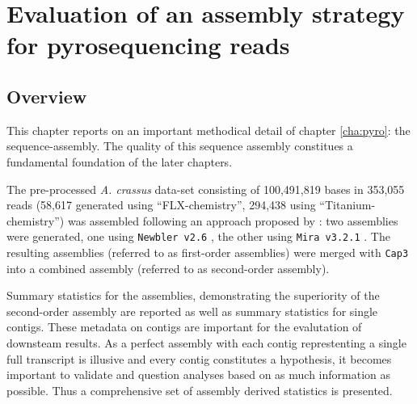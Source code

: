 
\chapter{Evaluation of an assembly strategy for pyrosequencing
  reads} %
\label{chap:eval-ass}


\ifpdf
    \graphicspath{{4_eval_ass/figures/PNG/}{4_eval_ass/figures/PDF/}{4_eval_ass/figures/}}
\else
    \graphicspath{{4_eval_ass/figures/EPS/}{4_eval_ass/figures/}}
\fi



\section{Overview}
\label{sec:over-eval}

This chapter reports on an important methodical detail of chapter
\ref{cha:pyro}: the sequence-assembly. The quality of this sequence
assembly constitues a fundamental foundation of the later chapters.

The pre-processed \textit{A. crassus} data-set consisting of
100,491,819 bases in 353,055 reads (58,617 generated using
``FLX-chemistry'', 294,438 using ``Titanium-chemistry'') was assembled
following an approach proposed by \cite{pmid20950480}: two assemblies
were generated, one using \texttt{Newbler v2.6} \cite{pmid16056220},
the other using \texttt{Mira v3.2.1} \cite{miraEST}. The resulting
assemblies (referred to as first-order assemblies) were merged with
\texttt{Cap3} \cite{Cap3_Huang} into a combined assembly (referred to
as second-order assembly).

Summary statistics for the assemblies, demonstrating the superiority
of the second-order assembly are reported as well as summary
statistics for single contigs. These metadata on contigs are important
for the evalutation of downsteam results. As a perfect assembly with
each contig represtenting a single full transcript is illusive and
every contig constitutes a hypothesis, it becomes important to
validate and question analyses based on as much information as
possible. Thus a comprehensive set of assembly derived statistics is
presented.

